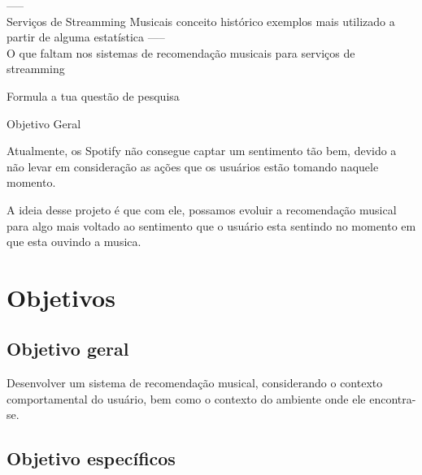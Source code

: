 \documentclass{article}
\begin{document}


----- \\

Serviços de Streamming Musicais
  conceito
  histórico
  exemplos
  mais utilizado a partir de alguma estatística
----- \\







O que faltam nos sistemas de recomendação musicais para serviços de streamming


Formula a tua questão de pesquisa


Objetivo Geral


Atualmente, os Spotify não consegue captar um sentimento tão bem, devido a não levar em consideração as ações que os usuários estão tomando naquele momento. 

A ideia desse projeto é que com ele, possamos evoluir a recomendação musical para algo mais voltado ao sentimento que o usuário esta sentindo no momento em que esta ouvindo a musica.

\newpage

\section{Objetivos}

\subsection{Objetivo geral}

Desenvolver um sistema de recomendação musical, considerando o contexto comportamental do usuário, bem como o contexto do ambiente onde ele encontra-se.

\subsection{Objetivo específicos}
\end{document}
